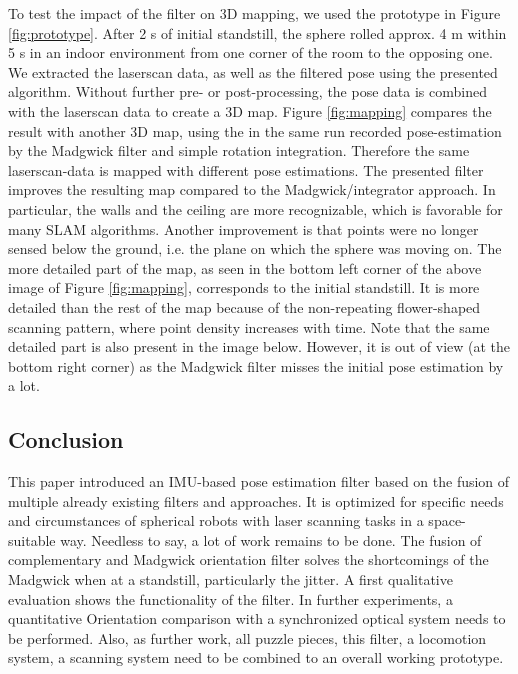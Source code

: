 \documentclass[letterpaper, 10 pt, conference]{ieeeconf}  %
\begin{document}
To test the impact of the filter on 3D mapping, we used the prototype in Figure \ref{fig:prototype}.
After 2 s of initial standstill, the sphere rolled approx. 4 m within 5 s in an indoor environment from one corner of the room to the opposing one.
We extracted the laserscan data, as well as the filtered pose using the presented algorithm.
Without further pre- or post-processing, the pose data is combined with the laserscan data to create a 3D map.
Figure \ref{fig:mapping} compares the result with another 3D map, using the in the same run recorded pose-estimation by the Madgwick filter and simple rotation integration.
Therefore the same laserscan-data is mapped with different pose estimations.
The presented filter improves the resulting map compared to the Madgwick/integrator approach.
In particular, the walls and the ceiling are more recognizable, which is favorable for many SLAM algorithms.
Another improvement is that points were no longer sensed below the ground, i.e. the plane on which the sphere was moving on.
The more detailed part of the map, as seen in the bottom left corner of the above image of Figure \ref{fig:mapping}, corresponds to the initial standstill.
It is more detailed than the rest of the map because of the non-repeating flower-shaped scanning pattern, where point density increases with time.
Note that the same detailed part is also present in the image below.
However, it is out of view (at the bottom right corner) as the Madgwick filter misses the initial pose estimation by a lot. 


\subsection{Conclusion}
This paper introduced an IMU-based pose estimation filter based on the fusion of multiple already existing filters and approaches.
It is optimized for specific needs and circumstances of spherical robots with laser scanning tasks in a space-suitable way.
Needless to say, a lot of work remains to be done.
The fusion of complementary and Madgwick orientation filter solves the shortcomings of the Madgwick when at a standstill, particularly the jitter.
A first qualitative evaluation shows the functionality of the filter.
In further experiments, a quantitative Orientation comparison with a synchronized optical system needs to be performed.
Also, as further work, all puzzle pieces, this filter, a locomotion system, a scanning system need to be combined to an overall working prototype.
\end{document}
